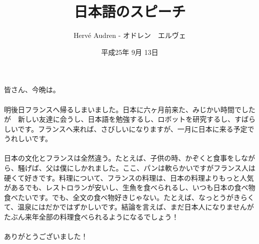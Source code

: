 \documentclass[a4paper,11pt]{article}
\begin{document}
\begin{CJK}{UTF8}{min}
\doublespacing
\author{Herv\'e Audren - オドレン　エルヴェ}
\title{日本語のスピーチ}
\date{平成25年 9月 13日}
\maketitle

\paragraph*{}皆さん、今晩は。
\paragraph*{}明後日フランスへ帰るしまいました。日本に六ヶ月前来た、みじかい時間でしたが　新しい友達に会うし、日本語を勉強するし、ロボットを研究するし、すばらしいです。フランスへ来れば、さびしいになりますが、一月に日本に来る予定でうれしいです。

\paragraph*{}日本の文化とフランスは全然違う。たとえば、子供の時、かぞくと食事をしながら、騒げば、父は僕にしかれました。ここ、パンは軟らかいですがフランス人は硬くて好きです。料理について、フランスの料理は、日本の料理よりもっと人気があるでも、レストロランが安いし、生魚を食べられるし、いつも日本の食べ物食べたいです。でも、全文の食べ物好きじゃない。たとえば、なっとうがきらくて、温泉にはだかではずかしいです。結論を言えば、まだ日本人になりませんがたぶん来年全部の料理食べられるようになるでしょう！

\paragraph*{}ありがとうございました！

\end{CJK}
\end{document}
